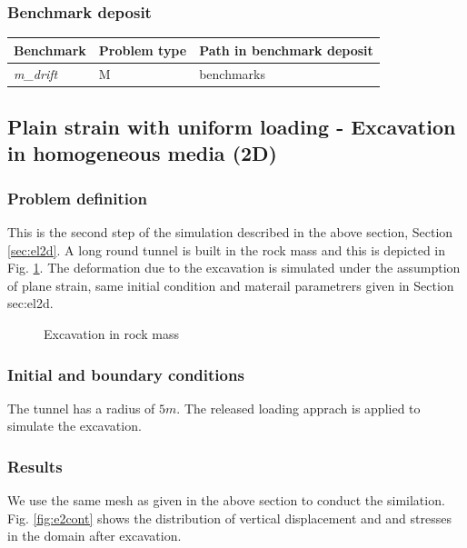 %
\subsubsection*{Benchmark deposit}
\begin{tabular}{|l|l|l|}
  \hline
  Benchmark & Problem type & Path in benchmark deposit \\
  \hline
 \emph{m\_drift} & M & benchmarks\verb \M\ \\
  \hline
\end{tabular}


\newpage

\subsection[Excavation in homogeneous media (2D)]{Plain strain with uniform loading - Excavation in homogeneous media (2D)}
\label{sec:e2}
\subsubsection*{Problem definition}
This is the second step of the simulation described in the above
section, Section \ref{sec:el2d}. A long round tunnel is built in the rock mass and this is depicted in Fig. \ref{fme:excav}.
 The deformation due to the excavation  is simulated under the assumption of plane strain, same initial condition and materail parametrers given in Section {sec:el2d}.
\begin{figure}[!thb]
  \begin{center}
  \end{center}
  \caption{Excavation in rock mass }
  \label{fme:excav}
\end{figure}


\subsubsection*{Initial and boundary conditions}
The tunnel has a radius of $5m$. The released loading apprach is applied to simulate the excavation.

\subsubsection*{Results}
We use the same mesh as given in the above section to conduct the similation.
Fig. \ref{fig:e2cont} shows the distribution of vertical
displacement and and stresses in the domain after excavation.


